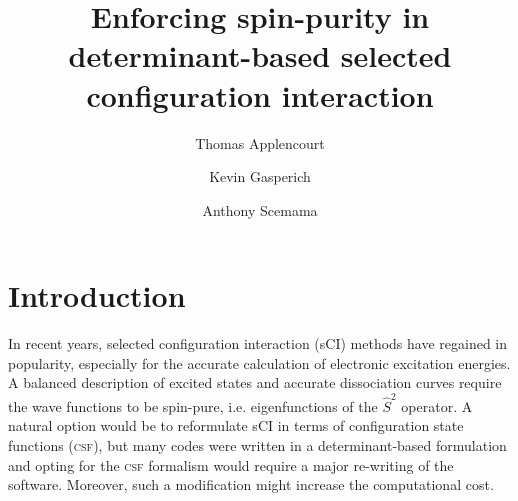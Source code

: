 \documentclass[aip,jcp,reprint,showkeys]{revtex4-1}
\newcommand{\stwo}{\hat{S}^2}
\newcommand{\csf}{\textsc{csf}}
\begin{document}
\title{Enforcing spin-purity in determinant-based selected configuration interaction}

\author{Thomas Applencourt}
\author{Kevin Gasperich}
\author{Anthony Scemama}

\begin{abstract}
\end{abstract}


\maketitle

\section{Introduction}

In recent years, selected configuration interaction (sCI) methods have regained in
popularity,\cite{Greer_1998,Stampfuss_2005,Bytautas_2009,Booth_2009,Giner_2013,Buenker_2014,Holmes_2016,Ohtsuka_2017,Coe_2018}
especially for the accurate calculation of electronic excitation
energies.\cite{Coe_2013,Schriber_2017,Holmes_2017,Loos_2018,Scemama_2018,Dash_2018}
A balanced description of excited states and accurate dissociation curves require
the wave functions to be spin-pure, i.e. eigenfunctions of the $\stwo$
operator. A natural option would be to reformulate sCI in terms of
configuration state functions (\csf), but many codes were written in a
determinant-based formulation and opting for the {\csf} formalism would require
a major re-writing of the software. Moreover, such a modification might
increase the computational cost.\cite{Knowles_1984,Olsen_1988}
\end{document}
